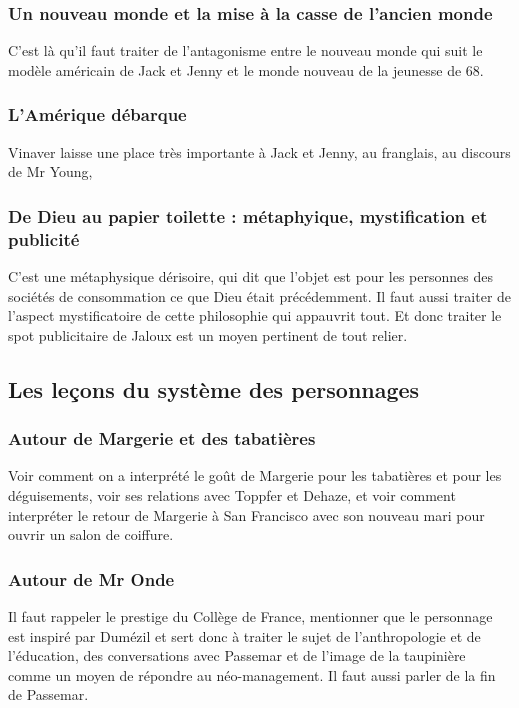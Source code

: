 \documentclass[a4paper,12pt]{book}
\begin{document}
\subsubsection{Un nouveau monde et la mise à la casse de l'ancien monde}
C'est là qu'il faut traiter de l'antagonisme entre le nouveau monde qui suit le modèle américain de Jack et Jenny et le monde nouveau de la jeunesse de 68.

\subsubsection{L'Amérique débarque}
Vinaver laisse une place très importante à Jack et Jenny, au franglais, au discours de Mr Young, 

\subsubsection{De Dieu au papier toilette : métaphyique, mystification et publicité}
C'est une métaphysique dérisoire, qui dit que l'objet est pour les personnes des sociétés de consommation ce que Dieu était précédemment. Il faut aussi traiter de l'aspect mystificatoire de cette philosophie qui appauvrit tout. Et donc traiter le spot publicitaire de Jaloux est un moyen pertinent de tout relier.


\subsection{Les leçons du système des personnages}
\subsubsection{Autour de Margerie et des tabatières}
Voir comment on a interprété le goût de Margerie pour les tabatières et pour les déguisements, voir ses relations avec Toppfer et Dehaze, et voir comment interpréter le retour de Margerie à San Francisco avec son nouveau mari pour ouvrir un salon de coiffure.

\subsubsection{Autour de Mr Onde}
Il faut rappeler le prestige du Collège de France, mentionner que le personnage est inspiré par Dumézil et sert donc à traiter le sujet de l'anthropologie et de l'éducation, des conversations avec Passemar et de l'image de la taupinière comme un moyen de répondre au néo-management. Il faut aussi parler de la fin de Passemar.
\end{document}
